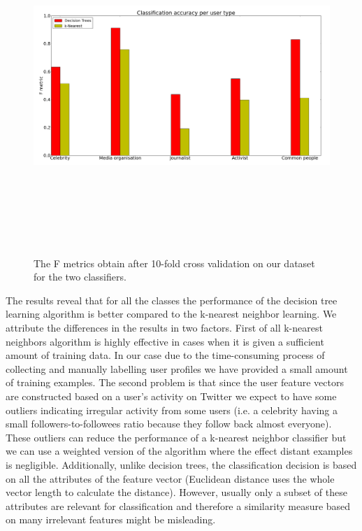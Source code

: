 \begin{figure}[htbp]
  \begin{center}
    \includegraphics[height=5in, width=6in]{classifiers_bad}
    \caption{The F metrics obtain after 10-fold cross validation on our dataset for the two classifiers.}
    \label{DifferentClassifiersResults}
  \end{center}
\end{figure}
The results reveal that for all the classes the performance of the decision tree learning algorithm is better compared to the k-nearest neighbor learning. We attribute the differences in the results in two factors. First of all k-nearest neighbors algorithm is highly effective in cases when it is given a sufficient amount of training data. In our case due to the time-consuming process of collecting and manually labelling user profiles we have provided a small amount of training examples. The second problem is that since the user feature vectors are constructed based on a user's activity on Twitter we expect to have some outliers indicating irregular activity from some users (i.e. a celebrity having a small followers-to-followees ratio because they follow back almost everyone). These outliers can reduce the performance of a k-nearest neighbor classifier but we can use a weighted version of the algorithm where the effect distant examples is negligible. Additionally, unlike decision trees, the classification decision is based on all the attributes of the feature vector (Euclidean distance uses the whole vector length to calculate the distance). However, usually only a subset of these attributes are relevant for classification and therefore a similarity measure based on many irrelevant features might be misleading.\\\\ 
